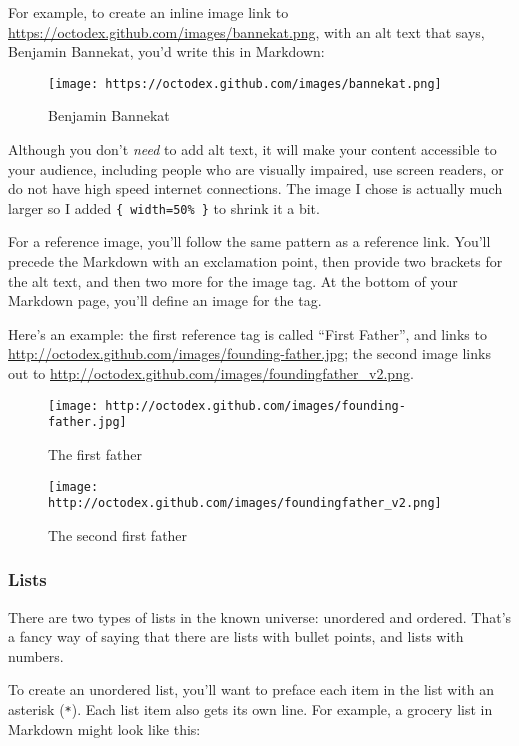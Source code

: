 \documentclass[
]{article}
\begin{document}
For example, to create an inline image link to
\url{https://octodex.github.com/images/bannekat.png}, with an alt text
that says, Benjamin Bannekat, you'd write this in Markdown:

\begin{figure}
\centering
\texttt{[image: https://octodex.github.com/images/bannekat.png]}
\caption{Benjamin Bannekat}
\end{figure}

Although you don't \emph{need} to add alt text, it will make your
content accessible to your audience, including people who are visually
impaired, use screen readers, or do not have high speed internet
connections. The image I chose is actually much larger so I added
\texttt{\{\ width=50\%\ \}} to shrink it a bit.

For a reference image, you'll follow the same pattern as a reference
link. You'll precede the Markdown with an exclamation point, then
provide two brackets for the alt text, and then two more for the image
tag. At the bottom of your Markdown page, you'll define an image for the
tag.

Here's an example: the first reference tag is called ``First Father'',
and links to \url{http://octodex.github.com/images/founding-father.jpg};
the second image links out to
\url{http://octodex.github.com/images/foundingfather_v2.png}.

\begin{figure}
\centering
\texttt{[image: http://octodex.github.com/images/founding-father.jpg]}
\caption{The first father}
\end{figure}

\begin{figure}
\centering
\texttt{[image: http://octodex.github.com/images/foundingfather\_v2.png]}
\caption{The second first father}
\end{figure}

\hypertarget{lists}{%
\subsubsection{Lists}\label{lists}}

There are two types of lists in the known universe: unordered and
ordered. That's a fancy way of saying that there are lists with bullet
points, and lists with numbers.

To create an unordered list, you'll want to preface each item in the
list with an asterisk (\texttt{*}). Each list item also gets its own
line. For example, a grocery list in Markdown might look like this:
\end{document}
